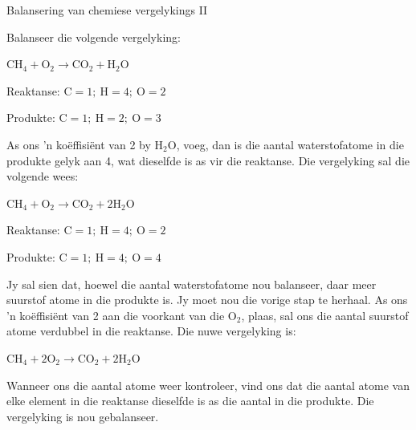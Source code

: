 \begin{wex}{Balansering van chemiese vergelykings II}{Balanseer die volgende vergelyking:
\begin{center}
${\text{CH}_{4} + \text{O}_{2} \rightarrow \text{CO}_{2} + \text{H}_{2}\text{O}}$
\end{center}
}

{

Reaktanse: $\text{C} = 1;~ \text{H} = 4;~ \text{O} = 2$

Produkte: $\text{C} = 1;~ \text{H} = 2;~ \text{O} = 3$
}

{

As ons 'n koëffisiënt van 2 by $\text{H}_{2}\text{O}$, voeg, dan is die aantal waterstofatome in die produkte gelyk aan  4, wat   dieselfde is  as vir die reaktanse. Die vergelyking sal die volgende wees:

\begin{center}
${\text{CH}_{4} + \text{O}_{2} \rightarrow \text{CO}_{2} + 2\text{H}_{2}\text{O}}$\\
\end{center}
}

{

Reaktanse: $\text{C} = 1;~ \text{H} = 4;~ \text{O} = 2$

Produkte: $\text{C} = 1;~ \text{H} = 4; ~\text{O} = 4$

Jy sal sien dat, hoewel die aantal waterstofatome nou balanseer, daar meer suurstof atome in die produkte is. Jy moet nou die vorige stap te herhaal. As ons 'n koëffisiënt van 2 aan die voorkant van die $\text{O}_{2}$, plaas, sal ons die aantal suurstof atome verdubbel in die reaktanse. Die nuwe vergelyking is:

\begin{center}
${\text{CH}_{4} + 2\text{O}_{2} \rightarrow \text{CO}_{2} + 2\text{H}_{2}\text{O}}$
\end{center}

Wanneer ons die aantal atome weer kontroleer, vind ons dat die aantal atome van elke element in die reaktanse dieselfde is as die aantal in die produkte. Die vergelyking is nou gebalanseer.
}
\end{wex}
    \noindent
\label{m38726*secfhsst!!!underscore!!!id501}
      \noindent
\par
            \label{m38726*secfhsst!!!underscore!!!id590} 
      \noindent
